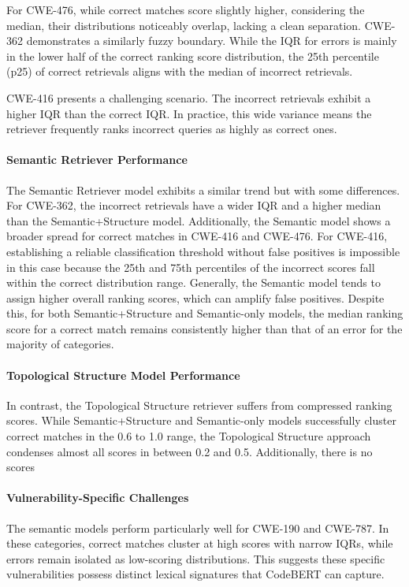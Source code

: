 For CWE-476, while correct matches score slightly higher, considering the median, their distributions noticeably overlap, lacking a clean separation. CWE-362 demonstrates a similarly fuzzy boundary. While the IQR for errors is mainly in the lower half of the correct ranking score distribution, the 25th percentile (p25) of correct retrievals aligns with the median of incorrect retrievals.

CWE-416 presents a challenging scenario. The incorrect retrievals exhibit a higher IQR than the correct IQR. In practice, this wide variance means the retriever frequently ranks incorrect queries as highly as correct ones. 

\paragraph{Semantic Retriever Performance}
The Semantic Retriever model exhibits a similar trend but with some differences. 
For CWE-362, the incorrect retrievals have a wider IQR and a higher median than the Semantic+Structure model. 
Additionally, the Semantic model shows a broader spread for correct matches in CWE-416 and CWE-476. 
For CWE-416, establishing a reliable classification threshold without false positives is impossible in this case because the 25th and 75th percentiles of the incorrect scores fall within the correct distribution range.
Generally, the Semantic model tends to assign higher overall ranking scores, which can amplify false positives. 
Despite this, for both Semantic+Structure and Semantic-only models, the median ranking score for a correct match remains consistently higher than that of an error for the majority of categories.

\paragraph{Topological Structure Model Performance}
In contrast, the Topological Structure retriever suffers from compressed ranking scores.
While Semantic+Structure and Semantic-only models successfully cluster correct matches in the 0.6 to 1.0 range, the Topological Structure approach condenses almost all scores in between 0.2 and 0.5. Additionally, there is no  scores 

\paragraph{Vulnerability-Specific Challenges}
The semantic models perform particularly well for CWE-190 and CWE-787. In these categories, correct matches cluster at high scores with narrow IQRs, while errors remain isolated as low-scoring distributions. 
This suggests these specific vulnerabilities possess distinct lexical signatures that CodeBERT can capture.

